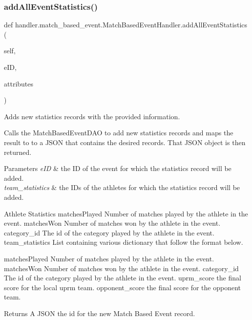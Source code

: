 \subsubsection{\texorpdfstring{add\+All\+Event\+Statistics()}{addAllEventStatistics()}}
{\footnotesize\ttfamily def handler.\+match\+\_\+based\+\_\+event.\+Match\+Based\+Event\+Handler.\+add\+All\+Event\+Statistics (\begin{DoxyParamCaption}\item[{}]{self,  }\item[{}]{e\+ID,  }\item[{}]{attributes }\end{DoxyParamCaption})}



Adds new statistics records with the provided information. 

Calls the Match\+Based\+Event\+D\+AO to add new statistics records and maps the result to to a J\+S\+ON that contains the desired records. That J\+S\+ON object is then returned.


\begin{DoxyParams}{Parameters}
{\em e\+ID} & the ID of the event for which the statistics record will be added. \\
\hline
{\em team\+\_\+statistics} & the I\+Ds of the athletes for which the statistics record will be added.\\
\hline
\end{DoxyParams}
\begin{DoxyParagraph}{Athlete Statistics}
matches\+Played Number of matches played by the athlete in the event. matches\+Won Number of matches won by the athlete in the event. category\+\_\+id The id of the category played by the athlete in the event. team\+\_\+statistics List containing various dictionary that follow the format below.
\end{DoxyParagraph}
matches\+Played Number of matches played by the athlete in the event. matches\+Won Number of matches won by the athlete in the event. category\+\_\+id The id of the category played by the athlete in the event. uprm\+\_\+score the final score for the local uprm team. opponent\+\_\+score the final score for the opponent team.

\begin{DoxyReturn}{Returns}
A J\+S\+ON the id for the new Match Based Event record. 
\end{DoxyReturn}
\mbox{\label{classhandler_1_1match__based__event_1_1_match_based_event_handler_a0c2916ba9a415c8e3ddaae36a69e6e33}} 
